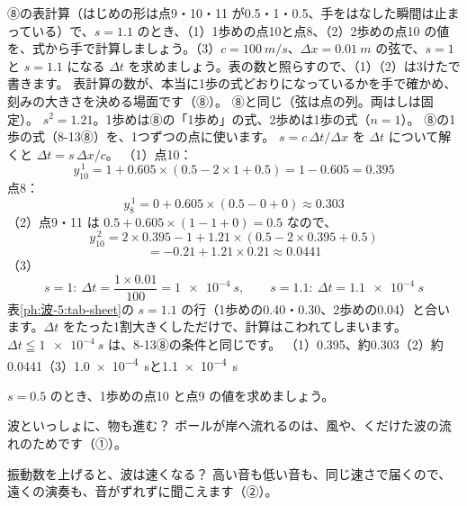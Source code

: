 \label{ph:波-5:ex13}
\begin{phreidai}[波の表計算を手で確かめる]
⑧の表計算（はじめの形は点9・10・11 が0.5・1・0.5、手をはなした瞬間は止まっている）で、$s=1.1$ のとき、（1）1歩めの点10と点8、（2）2歩めの点10 の値を、式から手で計算しましょう。（3）$c=\qty{100}{m/s}$、$\Delta x=\qty{0.01}{m}$ の弦で、$s=1$ と $s=1.1$ になる $\Delta t$ を求めましょう。表の数と照らすので、（1）（2）は3けたで書きます。
\phbamen
表計算の数が、本当に1歩の式どおりになっているかを手で確かめ、刻みの大きさを決める場面です（⑧）。
\phmushi
⑧と同じ（弦は点の列。両はしは固定）。
\phzu
$s^2=1.21$。1歩めは⑧の「1歩め」の式、2歩めは1歩の式（$n=1$）。
\phriyu
⑧の1歩の式（8-13⑧）を、1つずつの点に使います。
\phtateru
$s=c\,\Delta t/\Delta x$ を $\Delta t$ について解くと $\Delta t=s\,\Delta x/c$。
\phtoku
（1）点10：\[y^{\,1}_{10}=1+0.605\times(0.5-2\times1+0.5)=1-0.605=0.395\]
点8：\[y^{\,1}_{8}=0+0.605\times(0.5-0+0)\approx0.303\]
（2）点9・11 は $0.5+0.605\times(1-1+0)=0.5$ なので、
\[y^{\,2}_{10}=2\times0.395-1+1.21\times(0.5-2\times0.395+0.5)\]
\[=-0.21+1.21\times0.21\approx0.0441\]
（3）\[s=1:\ \Delta t=\frac{1\times0.01}{100}=\qty{1e-4}{s},\qquad s=1.1:\ \Delta t=\qty{1.1e-4}{s}\]
\phtashikame
表\ref{ph:波-5:tab-sheet}の $s=1.1$ の行（1歩めの0.40・0.30、2歩めの0.04）と合います。$\Delta t$ をたった1割大きくしただけで、計算はこわれてしまいます。$\Delta t\leqq\qty{1e-4}{s}$ は、8-13⑧の条件と同じです。
\kotae （1）0.395、約0.303（2）約0.0441（3）\qty{1.0e-4}{s}と\qty{1.1e-4}{s}
\end{phreidai}
\begin{jibun}
$s=0.5$ のとき、1歩めの点10 と点9 の値を求めましょう。
\end{jibun}

\begin{tsumazuki}{波といっしょに、物も進む？}
ボールが岸へ流れるのは、風や、くだけた波の流れのためです（①）。
\end{tsumazuki}

\begin{tsumazuki}{振動数を上げると、波は速くなる？}
高い音も低い音も、同じ速さで届くので、遠くの演奏も、音がずれずに聞こえます（②）。
\end{tsumazuki}

